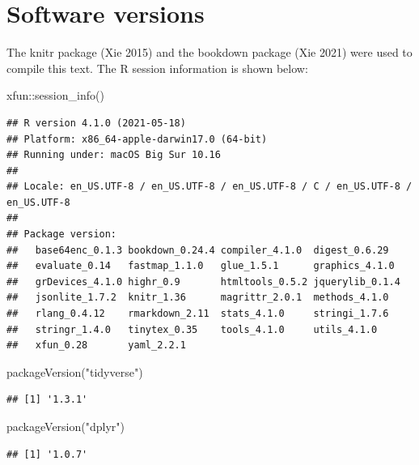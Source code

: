 \documentclass[
]{book}
\newenvironment{Shaded}{\begin{snugshade}}{\end{snugshade}}
\newcommand{\FunctionTok}[1]{\textcolor[rgb]{0.00,0.00,0.00}{#1}}
\newcommand{\NormalTok}[1]{#1}
\newcommand{\SpecialCharTok}[1]{\textcolor[rgb]{0.00,0.00,0.00}{#1}}
\newcommand{\StringTok}[1]{\textcolor[rgb]{0.31,0.60,0.02}{#1}}
\begin{document}
\hypertarget{software-versions}{%
\section*{Software versions}\label{software-versions}}

The knitr package (Xie 2015) and the bookdown package (Xie 2021) were used to compile this text. The R session information is shown below:

\begin{Shaded}
\begin{Highlighting}[]
\NormalTok{xfun}\SpecialCharTok{::}\FunctionTok{session\_info}\NormalTok{()}
\end{Highlighting}
\end{Shaded}

\begin{verbatim}
## R version 4.1.0 (2021-05-18)
## Platform: x86_64-apple-darwin17.0 (64-bit)
## Running under: macOS Big Sur 10.16
## 
## Locale: en_US.UTF-8 / en_US.UTF-8 / en_US.UTF-8 / C / en_US.UTF-8 / en_US.UTF-8
## 
## Package version:
##   base64enc_0.1.3 bookdown_0.24.4 compiler_4.1.0  digest_0.6.29  
##   evaluate_0.14   fastmap_1.1.0   glue_1.5.1      graphics_4.1.0 
##   grDevices_4.1.0 highr_0.9       htmltools_0.5.2 jquerylib_0.1.4
##   jsonlite_1.7.2  knitr_1.36      magrittr_2.0.1  methods_4.1.0  
##   rlang_0.4.12    rmarkdown_2.11  stats_4.1.0     stringi_1.7.6  
##   stringr_1.4.0   tinytex_0.35    tools_4.1.0     utils_4.1.0    
##   xfun_0.28       yaml_2.2.1
\end{verbatim}

\begin{Shaded}
\begin{Highlighting}[]
\FunctionTok{packageVersion}\NormalTok{(}\StringTok{"tidyverse"}\NormalTok{)}
\end{Highlighting}
\end{Shaded}

\begin{verbatim}
## [1] '1.3.1'
\end{verbatim}

\begin{Shaded}
\begin{Highlighting}[]
\FunctionTok{packageVersion}\NormalTok{(}\StringTok{"dplyr"}\NormalTok{)}
\end{Highlighting}
\end{Shaded}

\begin{verbatim}
## [1] '1.0.7'
\end{verbatim}
\end{document}
